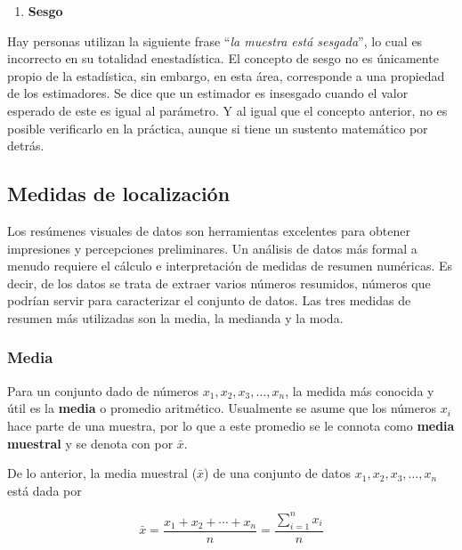 \documentclass[
]{book}
\providecommand{\tightlist}{%
  \setlength{\itemsep}{0pt}\setlength{\parskip}{0pt}}
\begin{document}
\begin{enumerate}
\def\labelenumi{\arabic{enumi}.}
\setcounter{enumi}{1}
\tightlist
\item
  \textbf{Sesgo}
\end{enumerate}

Hay personas utilizan la siguiente frase ``\emph{la muestra está sesgada}'', lo cual es incorrecto en su totalidad enestadística. El concepto de sesgo no es únicamente propio de la estadística, sin embargo, en esta área, corresponde a una propiedad de los estimadores. Se dice que un estimador es insesgado cuando el valor esperado de este es igual al parámetro. Y al igual que el concepto anterior, no es posible verificarlo en la práctica, aunque si tiene un sustento matemático por detrás.

\hypertarget{medidas-de-localizaciuxf3n}{%
\subsection{Medidas de localización}\label{medidas-de-localizaciuxf3n}}

Los resúmenes visuales de datos son herramientas excelentes para obtener impresiones y percepciones preliminares. Un análisis de datos más formal a menudo requiere el cálculo e interpretación de medidas de resumen numéricas. Es decir, de los datos se trata de extraer varios números resumidos, números que podrían servir para caracterizar el conjunto de datos. Las tres medidas de resumen más utilizadas son la media, la medianda y la moda.

\hypertarget{media}{%
\subsubsection*{Media}\label{media}}

Para un conjunto dado de números \(x_1, x_2, x_3, \ldots, x_n\), la medida más conocida y útil es la \textbf{media} o promedio aritmético. Usualmente se asume que los números \(x_i\) hace parte de una muestra, por lo que a este promedio se le connota como \textbf{media muestral} y se denota con por \(\bar{x}\).

De lo anterior, la media muestral (\(\bar{x}\)) de una conjunto de datos \(x_1, x_2, x_3, \ldots, x_n\) está dada por \citep[página 25]{Devore}

\begin{equation}
\bar{x} = \frac{x_1 + x_2 + \cdots + x_n}{n} = \frac{\displaystyle\sum_{i=1}^{n}x_i}{n}
\label{eq:promedio}
\end{equation}
\end{document}
